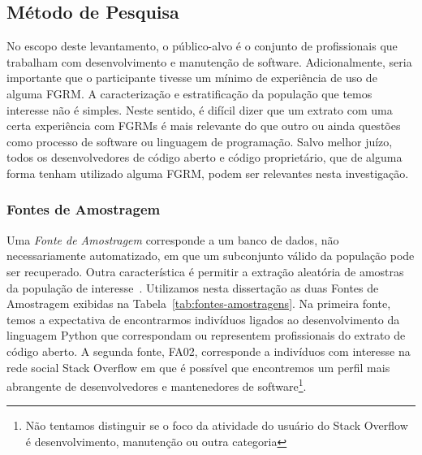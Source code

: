 \subsection{Método de Pesquisa}\label{subsec:pesq_metodologias}

No escopo deste levantamento, o público-alvo é o conjunto de profissionais que
trabalham com desenvolvimento e manutenção de software. Adicionalmente, seria
importante que o participante tivesse um mínimo de experiência de uso de alguma
FGRM\@. A caracterização e estratificação da população que temos interesse não
é simples. Neste sentido, é difícil dizer que um extrato com uma certa
experiência com FGRMs é mais relevante do que outro ou ainda questões como
processo de software ou linguagem de programação. Salvo melhor juízo, todos os
desenvolvedores de código aberto e código proprietário, que de alguma forma
tenham utilizado alguma FGRM, podem ser relevantes nesta investigação.

\subsubsection{Fontes de Amostragem}\label{subsubsec:fontes_amostragem}

Uma \textit{Fonte de Amostragem} corresponde a um banco de dados, não
necessariamente automatizado, em que um subconjunto válido da população pode
ser recuperado. Outra característica é permitir a extração aleatória de
amostras da população de interesse~\cite{de2014towards}. Utilizamos nesta
dissertação as duas Fontes de Amostragem exibidas na
Tabela~\ref{tab:fontes-amostragens}. Na primeira fonte, temos a expectativa de
encontrarmos indivíduos ligados ao desenvolvimento da linguagem Python que
correspondam ou representem profissionais do extrato de código aberto. A
segunda fonte, FA02, corresponde a indivíduos com interesse na rede social
Stack Overflow em que é possível que encontremos um perfil mais abrangente de
desenvolvedores e mantenedores de software\footnote{Não tentamos distinguir se
    o foco da atividade do usuário do Stack Overflow é desenvolvimento,
    manutenção ou outra categoria}.

\begin{table}[htpb]
\centering
{}
\caption{Fontes de Amostragem utilizadas no estudo}\label{tab:fontes-amostragens}
\end{table}

